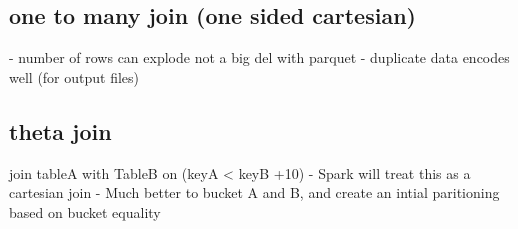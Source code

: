 \documentclass{article}
\begin{document}
\subsection{one to many join (one sided cartesian)}
- number of rows can explode
not a big del with parquet - duplicate data encodes well (for output files)

\subsection{theta join}
join tableA with TableB on (keyA < keyB +10)
  - Spark will treat this as a cartesian join
  - Much better to bucket A and B, and create an intial paritioning based on bucket equality
\end{document}
